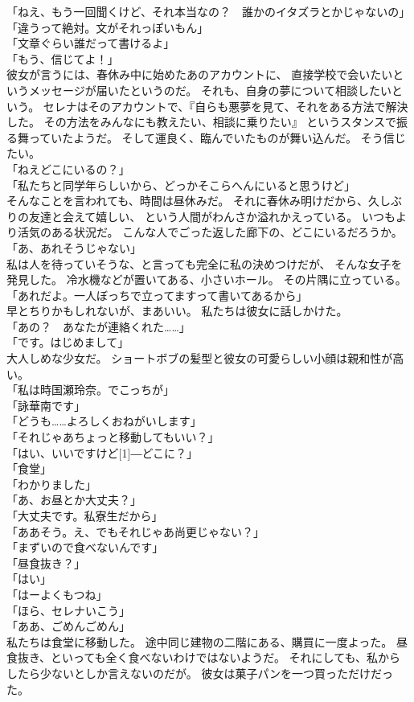 \documentclass[../IHMain]{subfiles}
\begin{document}
「ねえ、もう一回聞くけど、それ本当なの？　誰かのイタズラとかじゃないの」\\
「違うって絶対。文がそれっぽいもん」\\
「文章ぐらい誰だって書けるよ」\\
「もう、信じてよ！」\\
彼女が言うには、春休み中に始めたあのアカウントに、
直接学校で会いたいというメッセージが届いたというのだ。
それも、自身の夢について相談したいという。
セレナはそのアカウントで、『自らも悪夢を見て、それをある方法で解決した。
その方法をみんなにも教えたい、相談に乗りたい』
というスタンスで振る舞っていたようだ。
そして運良く、臨んでいたものが舞い込んだ。
そう信じたい。\\
「ねえどこにいるの？」\\
「私たちと同学年らしいから、どっかそこらへんにいると思うけど」\\
そんなことを言われても、時間は昼休みだ。
それに春休み明けだから、久しぶりの友達と会えて嬉しい、
という人間がわんさか溢れかえっている。
いつもより活気のある状況だ。
こんな人でごった返した廊下の、どこにいるだろうか。\\
「あ、あれそうじゃない」\\
私は人を待っていそうな、と言っても完全に私の決めつけだが、
そんな女子を発見した。
冷水機などが置いてある、小さいホール。
その片隅に立っている。\\
「あれだよ。一人ぼっちで立ってますって書いてあるから」\\
早とちりかもしれないが、まあいい。
私たちは彼女に話しかけた。\\
「あの？　あなたが連絡くれた……」\\
「です。はじめまして」\\
大人しめな少女だ。
ショートボブの髪型と彼女の可愛らしい小顔は親和性が高い。\\
「私は時国瀬玲奈。でこっちが」\\
「詠華南です」\\
「どうも……よろしくおねがいします」\\
「それじゃあちょっと移動してもいい？」\\
「はい、いいですけど\scalebox{3}[1]{―}どこに？」\\
「食堂」\\
「わかりました」\\
「あ、お昼とか大丈夫？」\\
「大丈夫です。私寮生だから」\\
「ああそう。え、でもそれじゃあ尚更じゃない？」\\
「まずいので食べないんです」\\
「昼食抜き？」\\
「はい」\\
「はーよくもつね」\\
「ほら、セレナいこう」\\
「ああ、ごめんごめん」\\
私たちは食堂に移動した。
途中同じ建物の二階にある、購買に一度よった。
昼食抜き、といっても全く食べないわけではないようだ。
それにしても、私からしたら少ないとしか言えないのだが。
彼女は菓子パンを一つ買っただけだった。
\end{document}
